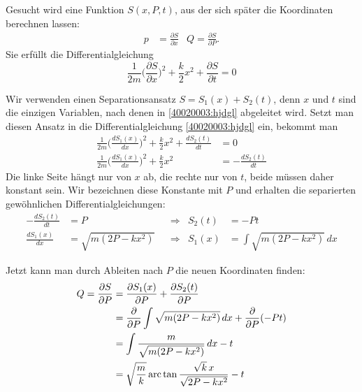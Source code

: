 \begin{loesung}
\begin{teilaufgaben}
\item Gesucht wird eine Funktion $S(x,P,t)$, aus der sich später die
Koordinaten berechnen lassen:
\begin{align*}
p&=\frac{\partial S}{\partial x} & Q=\frac{\partial S}{\partial P}.
\end{align*}
Sie erfüllt die Differentialgleichung
\begin{equation}
\frac1{2m}\biggl(\frac{\partial S}{\partial x}\biggr)^2+\frac{k}2x^2
+\frac{\partial S}{\partial t}=0
\label{40020003:hjdgl}
\end{equation}
\item
Wir verwenden einen Separationsansatz $S=S_1(x)+S_2(t)$, denn $x$ und $t$
sind die einzigen Variablen, nach denen in \eqref{40020003:hjdgl}
abgeleitet wird.
Setzt man diesen Ansatz in die Differentialgleichung \eqref{40020003:hjdgl}
ein, bekommt man
\begin{align*}
\frac1{2m}\biggl(\frac{dS_1(x)}{dx}\biggr)^2+\frac{k}2x^2+\frac{dS_2(t)}{dt}&=0
\\
\frac1{2m}\biggl(\frac{dS_1(x)}{dx}\biggr)^2+\frac{k}2x^2&=-\frac{dS_2(t)}{dt}
\end{align*}
Die linke Seite hängt nur von $x$ ab, die rechte nur von $t$, beide müssen
daher konstant sein.
Wir bezeichnen diese Konstante mit $P$ und erhalten
die separierten gewöhnlichen Differentialgleichungen:
\begin{align*}
-\frac{dS_2(t)}{dt}&=P&
&\Rightarrow&
S_2(t)&=-Pt\\
\frac{dS_1(x)}{dx}&=\sqrt{m(2P-kx^2)}&
&\Rightarrow&
S_1(x)&=\int\sqrt{m(2P-kx^2)}\,dx
\end{align*}
\item
Jetzt kann man durch Ableiten nach $P$ die neuen Koordinaten finden:
\begin{align*}
Q=\frac{\partial S}{\partial P}
&=\frac{\partial S_1(x)}{\partial P}+\frac{\partial S_2(t)}{\partial P}
\notag
\\
&=\frac{\partial}{\partial P}\int\sqrt{m(2P-kx^2)}\,dx+\frac{\partial}{\partial P}(-Pt)
\notag
\\
&=\int \frac{m}{\sqrt{m(2P-kx^2)}} \,dx-t
\label{40020003:integral}
\\
&=\sqrt{\frac{m}{k}}\operatorname{arc}\tan\frac{\sqrt{k}\,x}{\sqrt{2P-kx^2}} -t

\end{align*}
\end{teilaufgaben}
\end{loesung}
